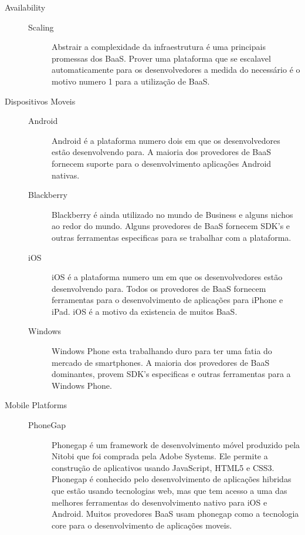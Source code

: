 \begin{description}
		\item[Availability]
			\begin{description}
				\item[]
                \item[Scaling] { Abstrair a complexidade da infraestrutura é uma principais promessas dos BaaS. Prover uma plataforma que se escalavel automaticamente para os desenvolvedores a medida do necessário é o motivo numero 1 para a utilização de BaaS.}
			\end{description}

		\item[Dispositivos Moveis]
			\begin{description}
				\item[]
                \item[Android] { Android é a plataforma numero dois em que os desenvolvedores estão desenvolvendo para. A maioria dos provedores de BaaS fornecem suporte para o desenvolvimento aplicações Android nativas. }

				\item[Blackberry] { Blackberry é ainda utilizado no mundo de Business e alguns nichos ao redor do mundo. Alguns provedores de BaaS fornecem SDK's e outras ferramentas especificas para se trabalhar com a plataforma. }
				
				\item[iOS] { iOS é a plataforma numero um em que os desenvolvedores estão desenvolvendo para. Todos os provedores de BaaS fornecem ferramentas para o desenvolvimento de aplicações para iPhone e iPad. iOS é a motivo da existencia de muitos BaaS. }
				
				\item[Windows] { Windows Phone esta trabalhando duro para ter uma fatia do mercado de smartphones. A maioria dos provedores de BaaS dominantes, provem SDK's especificas e outras ferramentas para a Windows Phone.}
			\end{description}

		\item[Mobile Platforms]
			\begin{description}
				\item[]
                \item[PhoneGap] { Phonegap é um framework de desenvolvimento móvel produzido pela Nitobi que foi comprada pela Adobe Systems. Ele permite a construção de aplicativos usando JavaScript, HTML5 e CSS3. Phonegap é conhecido pelo desenvolvimento de aplicações hibridas que estão usando tecnologias web, mas que tem acesso a uma das melhores ferramentas do desenvolvimento nativo para iOS e Android. Muitos provedores BaaS usam phonegap como a tecnologia core para o desenvolvimento de aplicações moveis. }


\end{description}
\end{description}
